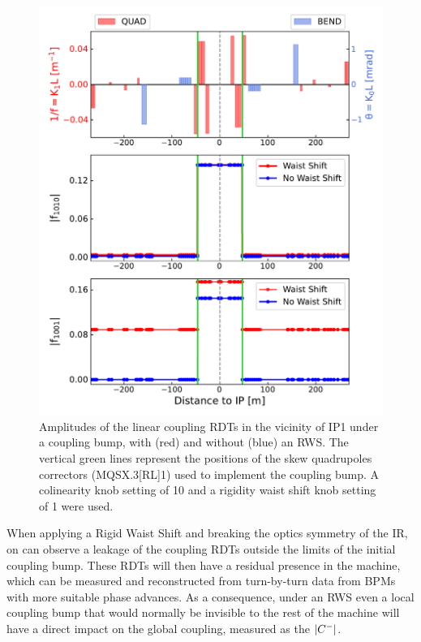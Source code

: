 \begin{figure}[!htb]
    \centering
    \includegraphics*[width=\columnwidth]{Figures/IR_Coupling_Correction/waist_shift_leaks_rdts.pdf}
    \caption{Amplitudes of the linear coupling RDTs in the vicinity of IP\num{1} under a coupling bump, with (\textcolor{mplr}{red}) and without (\textcolor{mplb}{blue}) an RWS. The vertical \textcolor{mqsx_green}{green} lines represent the positions of the skew quadrupoles correctors (MQSX.\num{3}[RL]\num{1}) used to implement the coupling bump. A colinearity knob setting of \num{10} and a rigidity waist shift knob setting of \num{1} were used.}
    \label{figure:rdt_leak}
\end{figure}

When applying a Rigid Waist Shift and breaking the optics symmetry of the IR, on can observe a leakage of the coupling RDTs outside the limits of the initial coupling bump.
These RDTs will then have a residual presence in the machine, which can be measured and reconstructed from turn-by-turn data from BPMs with more suitable phase advances.
As a consequence, under an RWS even a local coupling bump that would normally be invisible to the rest of the machine will have a direct impact on the global coupling, measured as the \(\left\lvert C^{-} \right\rvert\).

